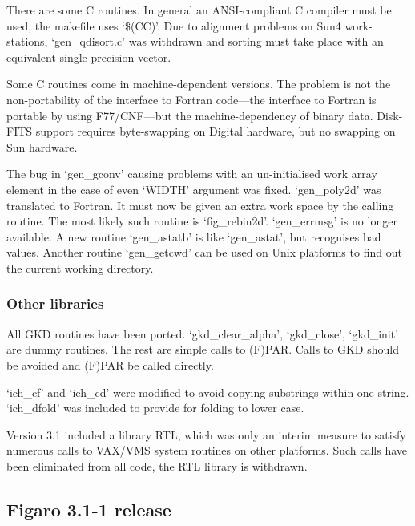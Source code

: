 \documentclass[11pt,twoside]{article}
\newcommand{\latorhtm}[2]{#1}
\newcommand{\latorhtm}[2]{#2}
\begin{document}
   There are some C routines. In general an ANSI-compliant C compiler
   must be used, the makefile uses `\$(CC)'. Due to alignment problems
   on Sun4 work-stations, `gen\_qdisort.c' was withdrawn and sorting must
   take place with an equivalent single-precision vector.

   Some C routines come in machine-dependent versions.  The problem
   is not the non-portability of the interface to Fortran
   code\latorhtm{---}{-}the
   interface to Fortran is portable by using F77/CNF\latorhtm{---}{-}but the
   machine-dependency of binary data.  Disk-FITS support requires
   byte-swapping on Digital hardware, but no swapping on Sun hardware.

   The bug in `gen\_gconv' causing problems with an un-initialised work
   array element in the case of even `WIDTH' argument was fixed.
   `gen\_poly2d' was translated to Fortran.  It must now be given an
   extra work space by the calling routine.  The most likely such
   routine is `fig\_rebin2d'.  `gen\_errmsg' is no longer available. A new
   routine `gen\_astatb' is like `gen\_astat', but recognises bad values.
   Another routine `gen\_getcwd' can be used on Unix platforms to find
   out the current working directory.


\subsubsection{\label{changessub10}Other libraries}

   All GKD routines have been ported. `gkd\_clear\_alpha', `gkd\_close',
   `gkd\_init' are dummy routines. The rest are simple calls to (F)PAR.
   Calls to GKD should be avoided and (F)PAR be called directly.


   `ich\_cf' and `ich\_cd' were modified to avoid copying substrings
   within one string. `ich\_dfold' was included to provide for folding to
   lower case.


   Version 3.1 included a library RTL, which was only an interim measure
   to satisfy numerous calls to VAX/VMS system routines on other
   platforms.  Such calls have been eliminated from all code, the RTL
   library is withdrawn.


\subsection{\label{news311}Figaro 3.1-1 release}
\end{document}

